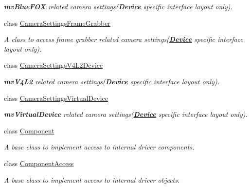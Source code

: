 \begin{DoxyCompactItemize}
\begin{DoxyCompactList}\small\item\em {\bfseries mv\+Blue\+F\+O\+X} related camera settings({\bfseries \hyperlink{classmv_i_m_p_a_c_t_1_1acquire_1_1_device}{Device}} specific interface layout only). \end{DoxyCompactList}\item 
class \hyperlink{classmv_i_m_p_a_c_t_1_1acquire_1_1_camera_settings_frame_grabber}{Camera\+Settings\+Frame\+Grabber}
\begin{DoxyCompactList}\small\item\em A class to access frame grabber related camera settings({\bfseries \hyperlink{classmv_i_m_p_a_c_t_1_1acquire_1_1_device}{Device}} specific interface layout only). \end{DoxyCompactList}\item 
class \hyperlink{classmv_i_m_p_a_c_t_1_1acquire_1_1_camera_settings_v4_l2_device}{Camera\+Settings\+V4\+L2\+Device}
\begin{DoxyCompactList}\small\item\em {\bfseries mv\+V4\+L2} related camera settings({\bfseries \hyperlink{classmv_i_m_p_a_c_t_1_1acquire_1_1_device}{Device}} specific interface layout only). \end{DoxyCompactList}\item 
class \hyperlink{classmv_i_m_p_a_c_t_1_1acquire_1_1_camera_settings_virtual_device}{Camera\+Settings\+Virtual\+Device}
\begin{DoxyCompactList}\small\item\em {\bfseries mv\+Virtual\+Device} related camera settings({\bfseries \hyperlink{classmv_i_m_p_a_c_t_1_1acquire_1_1_device}{Device}} specific interface layout only). \end{DoxyCompactList}\item 
class \hyperlink{classmv_i_m_p_a_c_t_1_1acquire_1_1_component}{Component}
\begin{DoxyCompactList}\small\item\em A base class to implement access to internal driver components. \end{DoxyCompactList}\item 
class \hyperlink{classmv_i_m_p_a_c_t_1_1acquire_1_1_component_access}{Component\+Access}
\begin{DoxyCompactList}\small\item\em A base class to implement access to internal driver objects. \end{DoxyCompactList}\item 

\end{DoxyCompactItemize}

